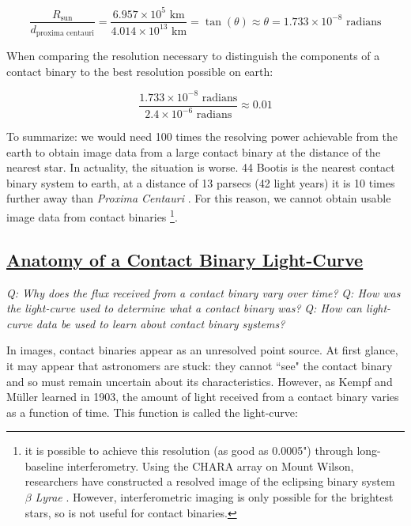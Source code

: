 \documentclass[12pt]{article} %
\numberwithin{equation}{section} %
\begin{document}
\begin{equation} \label{eqn: example_angle}
\frac{R_{\text{sun}}}{d_{\text{proxima centauri}}} = \frac{6.957 \times 10^{5} \text{ km}}{4.014 \times 10^{13} \text{ km}} = \tan(\theta) \approx \theta = 1.733 \times 10^{-8} \text{ radians}
\end{equation}

When comparing the resolution necessary to distinguish the components of a contact binary to the best resolution possible on earth:

\begin{equation} \label{eqn: resolution_comparison}
\frac{1.733 \times 10^{-8} \text{ radians}}{2.4 \times 10^{-6} \text{ radians}} \approx 0.01
\end{equation}

To summarize: we would need 100 times the resolving power achievable from the earth to obtain image data from a large contact binary at the distance of the nearest star. In actuality, the situation is worse. 44 Bootis is the nearest contact binary system to earth, at a distance of 13 parsecs (42 light years) it is 10 times further away than \emph{Proxima Centauri} \citep{eker2008new}. For this reason, we cannot obtain usable image data from contact binaries \footnote{it is possible to achieve this resolution (as good as 0.0005") through long-baseline interferometry. Using the CHARA array on Mount Wilson, researchers have constructed a resolved image of the eclipsing binary system $\beta$ \emph{Lyrae}  \citep{zhao2008first}. However, interferometric imaging is only possible for the brightest stars, so is not useful for contact binaries.}.

\subsection[Anatomy of a Contact Binary Light-Curve]{\hyperlink{toc}{Anatomy of a Contact Binary Light-Curve}} \label{sec: Anatomy of a Contact Binary Light-Curve}

\emph{Q: Why does the flux received from a contact binary vary over time?}
\emph{Q: How was the light-curve used to determine what a contact binary was?}
\emph{Q: How can light-curve data be used to learn about contact binary systems? }

In images, contact binaries appear as an unresolved point source. At first glance, it may appear that astronomers are stuck: they cannot ``see" the contact binary and so must remain uncertain about its characteristics. However, as Kempf and M\"{u}ller learned in 1903, the amount of light received from a contact binary varies as a function of time. This function is called the light-curve: 
\end{document}
